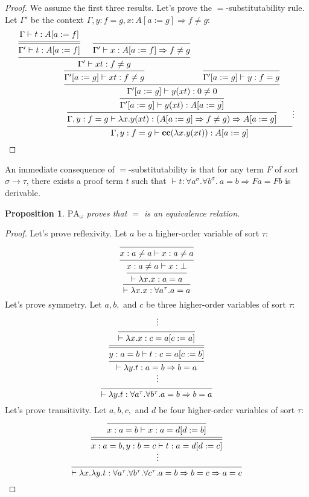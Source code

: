 \documentclass[a4paper,12pt]{article}
\newtheorem{prop}[theo]{Proposition}
\theoremstyle{rmqstyle}
\newcommand{\PA}{\mathrm{PA}}
\renewcommand{\implies}{\Rightarrow}
\newcommand{\cc}{\mathbf{cc}}
\begin{document}
\begin{proof} 
We assume the first three results. Let's prove the $=$-substitutability rule. Let $\Gamma'$ be the context $\Gamma, y : f = g, x : A[a := g] \implies f \neq g$:
$$
\begin{prooftree}[center=false]
\hypo{\Gamma \vdash t : A[a := f]}
\infer[double]1{\Gamma' \vdash t : A[a := f]}
\infer0{\Gamma' \vdash x : A[a := f] \implies f \neq g}
\infer2{\Gamma' \vdash xt : f \neq g}
\infer1{\Gamma'[a := g] \vdash xt : f \neq g}
\infer0{\Gamma'[a := g] \vdash y : f = g}
\infer2{\Gamma'[a := g] \vdash y(xt) : 0 \neq 0}
\infer1{\Gamma'[a := g] \vdash y(xt) : A[a := g]}
\infer1{\Gamma, y : f = g \vdash \lambda x. y(xt) : (A[a := g] \implies f \neq g) \implies A[a := g]}
\hypo{}
\ellipsis{}{}
\infer2{\Gamma, y : f = g \vdash \cc(\lambda x. y(xt)) : A[a := g]}
\end{prooftree}
$$
\end{proof}

An immediate consequence of $=$-substitutability is that for any term $F$ of sort $\sigma \to \tau$, there exists a proof term $t$ such that $\vdash t : \forall a^\sigma. \forall b^\sigma. \ a = b \implies Fa = Fb$ is derivable.

\begin{prop}
$\PA_\omega$ proves that $=$ is an equivalence relation.
\end{prop}

\begin{proof}
Let's prove reflexivity. Let $a$ be a higher-order variable of sort $\tau$:
$$
\begin{prooftree}[center=false]
\infer0{ x : a \neq a \vdash x : a \neq a}
\infer1{x : a \neq a \vdash x : \bot}
\infer1{\vdash \lambda x. x : a = a}
\infer1{\vdash \lambda x. x : \forall a^\tau. a = a}
\end{prooftree}
$$
Let's prove symmetry. Let $a, b,$ and $c$ be three higher-order variables of sort $\tau$:
$$
\begin{prooftree}[center=false]
\hypo{}
\ellipsis{}{}
\infer1{\vdash \lambda x.x : c = a[c := a]}
\infer[double]1{y : a = b \vdash t : c = a[c := b]}
\infer1{\vdash \lambda y. t : a = b \implies b = a}
\ellipsis{}{}
\infer1{\vdash \lambda y. t : \forall a^\tau. \forall b^\tau. a = b \implies b = a}
\end{prooftree}
$$
Let's prove transitivity. Let $a, b, c,$ and $d$ be four higher-order variables of sort $\tau$:
$$
\begin{prooftree}[center=false]
\infer0{x : a = b \vdash x : a = d[d := b]}
\infer[double]1{x : a = b, y : b = c \vdash t : a = d[d := c]}
\ellipsis{}{}
\infer1{\vdash \lambda x. \lambda y. t : \forall a^\tau. \forall b^\tau. \forall c^\tau. a = b \implies b = c \implies a = c}
\end{prooftree}
$$
\end{proof}
\end{document}
